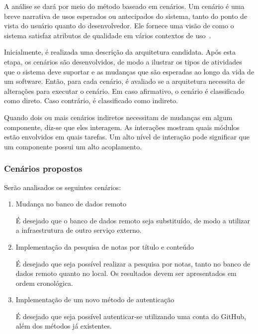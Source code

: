 A análise se dará por meio do método baseado em cenários.
Um cenário é uma breve narrativa de usos esperados ou antecipados do sistema, tanto do ponto de vista do usuário quanto do desenvolvedor.
Ele fornece uma visão de como o sistema satisfaz atributos de qualidade em vários contextos de uso~\cite{scenario-based}.

Inicialmente, é realizada uma descrição da arquitetura candidata.
Após esta etapa, os cenários são desenvolvidos, de modo a ilustrar os tipos de atividades que o sistema deve suportar e as mudanças que são esperadas ao longo da vida de um software.
Então, para cada cenário, é avaliado se a arquitetura necessita de alterações para executar o cenário.
Em caso afirmativo, o cenário é classificado como direto. Caso contrário, é classificado como indireto.

Quando dois ou mais cenários indiretos necessitam de mudanças em algum componente, diz-se que eles interagem.
As interações mostram quais módulos estão envolvidos em quais tarefas.
Um alto nível de interação pode significar que um componente possui um alto acoplamento.

\subsubsection{Cenários propostos}

Serão analisados os seguintes cenários:

\begin{enumerate}
	\item Mudança no banco de dados remoto

	      É desejado que o banco de dados remoto seja substituído, de modo a utilizar a infraestrutura de outro serviço externo.

	\item Implementação da pesquisa de notas por título e conteúdo

	      É desejado que seja possível realizar a pesquisa por notas, tanto no banco de dados remoto quanto no local. Os resultados devem ser apresentados em ordem cronológica.

	\item Implementação de um novo método de autenticação

	      É desejado que seja possível autenticar-se utilizando uma conta do GitHub, além dos métodos já existentes.
\end{enumerate}